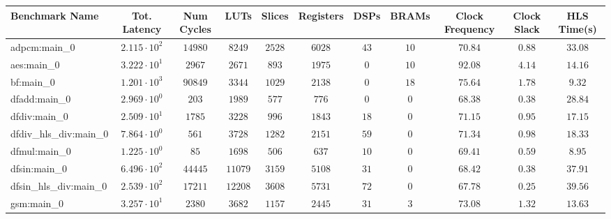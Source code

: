 \begin{tabular}{|l|c|c|c|c|c|c|c|c|c|c|}
\hline
Benchmark Name          & Tot. Latency           & Num Cycles & LUTs      & Slices    & Registers & DSPs    & BRAMs   & Clock Frequency & Clock Slack & HLS Time(s) \\
\hline
adpcm:main\_0           & $ 2.115 \cdot 10^{2} $ & $ 14980  $ & $ 8249  $ & $ 2528  $ & $ 6028  $ & $ 43  $ & $ 10  $ & $ 70.84       $ & $ 0.88    $ & $ 33.08   $ \\
aes:main\_0             & $ 3.222 \cdot 10^{1} $ & $ 2967   $ & $ 2671  $ & $ 893   $ & $ 1975  $ & $ 0   $ & $ 10  $ & $ 92.08       $ & $ 4.14    $ & $ 14.16   $ \\
bf:main\_0              & $ 1.201 \cdot 10^{3} $ & $ 90849  $ & $ 3344  $ & $ 1029  $ & $ 2138  $ & $ 0   $ & $ 18  $ & $ 75.64       $ & $ 1.78    $ & $ 9.32    $ \\
dfadd:main\_0           & $ 2.969 \cdot 10^{0} $ & $ 203    $ & $ 1989  $ & $ 577   $ & $ 776   $ & $ 0   $ & $ 0   $ & $ 68.38       $ & $ 0.38    $ & $ 28.84   $ \\
dfdiv:main\_0           & $ 2.509 \cdot 10^{1} $ & $ 1785   $ & $ 3228  $ & $ 996   $ & $ 1843  $ & $ 18  $ & $ 0   $ & $ 71.15       $ & $ 0.95    $ & $ 17.15   $ \\
dfdiv\_hls\_div:main\_0 & $ 7.864 \cdot 10^{0} $ & $ 561    $ & $ 3728  $ & $ 1282  $ & $ 2151  $ & $ 59  $ & $ 0   $ & $ 71.34       $ & $ 0.98    $ & $ 18.33   $ \\
dfmul:main\_0           & $ 1.225 \cdot 10^{0} $ & $ 85     $ & $ 1698  $ & $ 506   $ & $ 637   $ & $ 10  $ & $ 0   $ & $ 69.41       $ & $ 0.59    $ & $ 8.95    $ \\
dfsin:main\_0           & $ 6.496 \cdot 10^{2} $ & $ 44445  $ & $ 11079 $ & $ 3159  $ & $ 5108  $ & $ 31  $ & $ 0   $ & $ 68.42       $ & $ 0.38    $ & $ 37.91   $ \\
dfsin\_hls\_div:main\_0 & $ 2.539 \cdot 10^{2} $ & $ 17211  $ & $ 12208 $ & $ 3608  $ & $ 5731  $ & $ 72  $ & $ 0   $ & $ 67.78       $ & $ 0.25    $ & $ 39.56   $ \\
gsm:main\_0             & $ 3.257 \cdot 10^{1} $ & $ 2380   $ & $ 3682  $ & $ 1157  $ & $ 2445  $ & $ 31  $ & $ 3   $ & $ 73.08       $ & $ 1.32    $ & $ 13.63   $ \\

\end{tabular}
